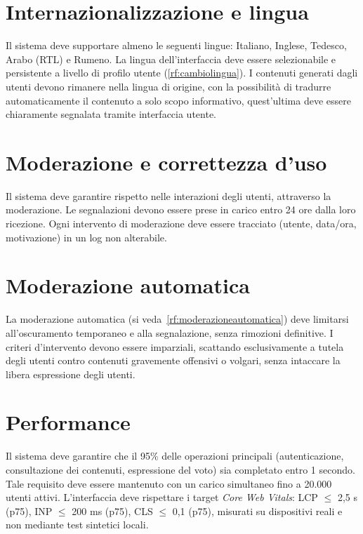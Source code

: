 \begin{rnfscope}
\section{Internazionalizzazione e lingua} \label{rnf:lingua}
Il sistema deve supportare almeno le seguenti lingue: Italiano, Inglese, Tedesco, Arabo (RTL) e Rumeno.
La lingua dell’interfaccia deve essere selezionabile e persistente a livello di profilo utente (\ref{rf:cambiolingua}).
I contenuti generati dagli utenti devono rimanere nella lingua di origine, con la possibilità di tradurre automaticamente il contenuto a solo scopo informativo, quest'ultima deve essere chiaramente segnalata tramite interfaccia utente.

\section{Moderazione e correttezza d’uso} \label{rnf:moderazione}
Il sistema deve garantire rispetto nelle interazioni degli utenti, attraverso la moderazione.
Le segnalazioni devono essere prese in carico entro 24 ore dalla loro ricezione.
Ogni intervento di moderazione deve essere tracciato (utente, data/ora, motivazione) in un log non alterabile.

\section{Moderazione automatica} \label{rnf:moderazioneautomatica}
La moderazione automatica (si veda~\ref{rf:moderazioneautomatica}) deve limitarsi all’oscuramento temporaneo e alla segnalazione, senza rimozioni definitive.  I criteri d'intervento devono essere imparziali, scattando esclusivamente a tutela degli utenti contro contenuti gravemente offensivi o volgari, senza intaccare la libera espressione degli utenti.

\section{Performance} \label{rnf:performance}
Il sistema deve garantire che il 95\% delle operazioni principali (autenticazione, consultazione dei contenuti, espressione del voto) sia completato entro 1 secondo.
Tale requisito deve essere mantenuto con un carico simultaneo fino a 20.000 utenti attivi.
L’interfaccia deve rispettare i target \emph{Core Web Vitals}: LCP $\leq$ 2{,}5 s (p75), INP $\leq$ 200 ms (p75), CLS $\leq$ 0{,}1 (p75),
misurati su dispositivi reali e non mediante test sintetici locali.


\end{rnfscope}
